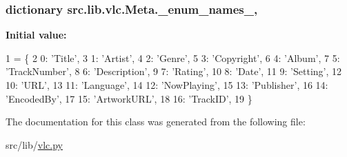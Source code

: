 \subsubsection[{\+\_\+enum\+\_\+names\+\_\+}]{\setlength{\rightskip}{0pt plus 5cm}dictionary src.\+lib.\+vlc.\+Meta.\+\_\+enum\+\_\+names\+\_\+\hspace{0.3cm}{\ttfamily [static]}, {\ttfamily [private]}}\label{classsrc_1_1lib_1_1vlc_1_1Meta_a9f7d14459cdacb3bd5c93b7f0c289a9b}
{\bfseries Initial value\+:}
\begin{DoxyCode}
1 = \{
2         0: \textcolor{stringliteral}{'Title'},
3         1: \textcolor{stringliteral}{'Artist'},
4         2: \textcolor{stringliteral}{'Genre'},
5         3: \textcolor{stringliteral}{'Copyright'},
6         4: \textcolor{stringliteral}{'Album'},
7         5: \textcolor{stringliteral}{'TrackNumber'},
8         6: \textcolor{stringliteral}{'Description'},
9         7: \textcolor{stringliteral}{'Rating'},
10         8: \textcolor{stringliteral}{'Date'},
11         9: \textcolor{stringliteral}{'Setting'},
12         10: \textcolor{stringliteral}{'URL'},
13         11: \textcolor{stringliteral}{'Language'},
14         12: \textcolor{stringliteral}{'NowPlaying'},
15         13: \textcolor{stringliteral}{'Publisher'},
16         14: \textcolor{stringliteral}{'EncodedBy'},
17         15: \textcolor{stringliteral}{'ArtworkURL'},
18         16: \textcolor{stringliteral}{'TrackID'},
19     \}
\end{DoxyCode}


The documentation for this class was generated from the following file\+:\begin{DoxyCompactItemize}
\item 
src/lib/\hyperlink{vlc_8py}{vlc.\+py}\end{DoxyCompactItemize}
